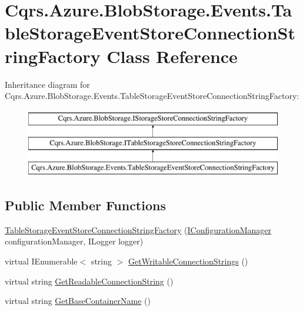 \hypertarget{classCqrs_1_1Azure_1_1BlobStorage_1_1Events_1_1TableStorageEventStoreConnectionStringFactory}{}\section{Cqrs.\+Azure.\+Blob\+Storage.\+Events.\+Table\+Storage\+Event\+Store\+Connection\+String\+Factory Class Reference}
\label{classCqrs_1_1Azure_1_1BlobStorage_1_1Events_1_1TableStorageEventStoreConnectionStringFactory}
Inheritance diagram for Cqrs.\+Azure.\+Blob\+Storage.\+Events.\+Table\+Storage\+Event\+Store\+Connection\+String\+Factory\+:\begin{figure}[H]
\begin{center}
\leavevmode
\includegraphics[height=3.000000cm]{classCqrs_1_1Azure_1_1BlobStorage_1_1Events_1_1TableStorageEventStoreConnectionStringFactory}
\end{center}
\end{figure}
\subsection*{Public Member Functions}
\begin{DoxyCompactItemize}
\item 
\hyperlink{classCqrs_1_1Azure_1_1BlobStorage_1_1Events_1_1TableStorageEventStoreConnectionStringFactory_a48d61b35856515a2bfb0674c1fa57995_a48d61b35856515a2bfb0674c1fa57995}{Table\+Storage\+Event\+Store\+Connection\+String\+Factory} (\hyperlink{interfaceCqrs_1_1Configuration_1_1IConfigurationManager}{I\+Configuration\+Manager} configuration\+Manager, I\+Logger logger)
\item 
virtual I\+Enumerable$<$ string $>$ \hyperlink{classCqrs_1_1Azure_1_1BlobStorage_1_1Events_1_1TableStorageEventStoreConnectionStringFactory_a07406c2607bdd42dd13116b92fc6b665_a07406c2607bdd42dd13116b92fc6b665}{Get\+Writable\+Connection\+Strings} ()
\item 
virtual string \hyperlink{classCqrs_1_1Azure_1_1BlobStorage_1_1Events_1_1TableStorageEventStoreConnectionStringFactory_a047e58aa30e97231dc913df350bc2446_a047e58aa30e97231dc913df350bc2446}{Get\+Readable\+Connection\+String} ()
\item 
virtual string \hyperlink{classCqrs_1_1Azure_1_1BlobStorage_1_1Events_1_1TableStorageEventStoreConnectionStringFactory_a118388598a7fa653122fc11521c915d7_a118388598a7fa653122fc11521c915d7}{Get\+Base\+Container\+Name} ()
\end{DoxyCompactItemize}
